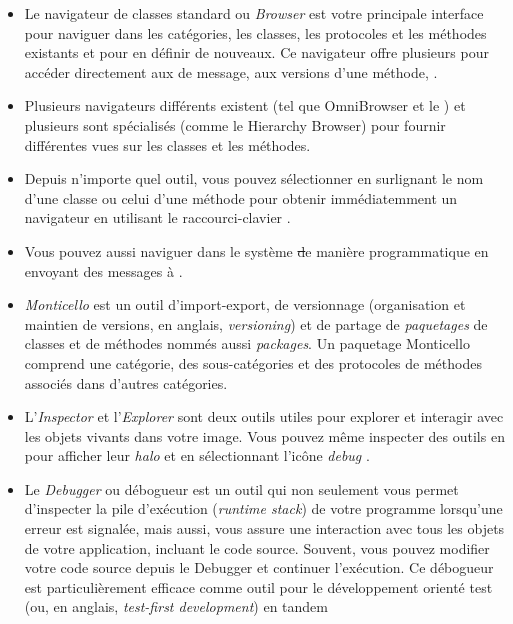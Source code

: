 \documentclass[a4paper,10pt,twoside]{book}
\begin{document}
\begin{itemize}
  \item Le navigateur de classes standard ou \emph{Browser} est votre principale interface pour naviguer dans les catégories, les classes, les protocoles et les méthodes existants et pour en définir de nouveaux.
Ce navigateur offre plusieurs  pour accéder %
directement aux  de message, aux versions d'une méthode, 
\etc.
  \item Plusieurs navigateurs différents existent
(tel que OmniBrowser et le ) %
et plusieurs sont spécialisés (comme le Hierarchy Browser) pour fournir différentes vues sur les classes et les méthodes.
  \item Depuis n'importe quel outil, vous pouvez sélectionner en surlignant le nom d'une classe ou celui d'une méthode pour obtenir immédiatemment
un navigateur en utilisant le raccourci-clavier .
  \item Vous pouvez aussi naviguer dans le système \st de manière
programmatique en envoyant des messages à .
  \item \emph{Monticello} est un outil d'import-export, de versionnage
    (organisation et maintien de versions, en anglais, \emph{versioning}) et de partage de \emph{paquetages} de classes et de méthodes nommés aussi \emph{packages}.
  Un paquetage Monticello comprend une catégorie, des sous-catégories et des protocoles de méthodes associés dans d'autres catégories. 
  \item L'\emph{Inspector} et l'\emph{Explorer} sont deux outils utiles
pour explorer et interagir avec les objets vivants dans votre image.
Vous pouvez même inspecter des outils en \actclickant{} pour
afficher leur \emph{halo} et en sélectionnant l'icône
\emph{debug} \debugHandle .
  \item Le \emph{Debugger} ou débogueur est un outil qui non seulement vous permet
d'inspecter la pile d'exécution (\emph{runtime stack}) de votre
programme lorsqu'une erreur est signalée, mais aussi, 
vous assure une interaction avec tous les objets de votre application,
incluant le code source. Souvent, vous pouvez modifier votre 
code source depuis le Debugger et continuer l'exécution.
Ce débogueur est particulièrement efficace comme outil pour
le développement orienté test (ou, en anglais, \emph{test-first development}) en tandem

\end{itemize}
\end{document}
